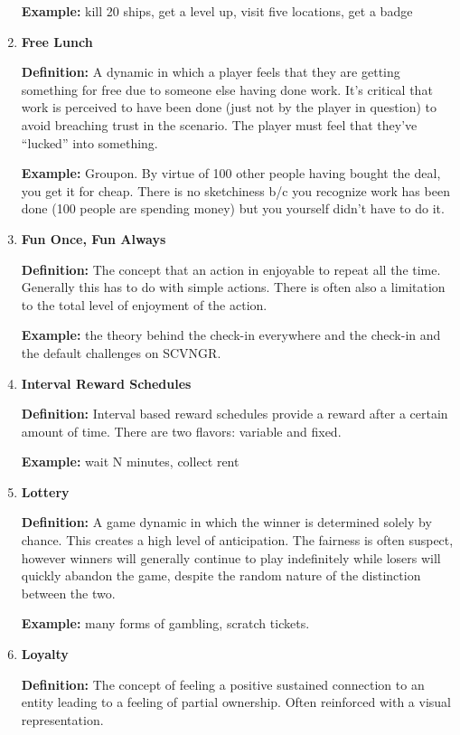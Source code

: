 \begin{enumerate}
\textbf{Example:} kill 20 ships, get a level up, visit five locations, get a badge

\item \textbf{Free Lunch}

\textbf{Definition:} A dynamic in which a player feels that they are getting something for free due to someone else having done work. It’s critical that work is perceived to have been done (just not by the player in question) to avoid breaching trust in the scenario. The player must feel that they’ve ``lucked'' into something.

\textbf{Example:} Groupon. By virtue of 100 other people having bought the deal, you get it for cheap. There is no sketchiness b/c you recognize work has been done (100 people are spending money) but you yourself didn’t have to do it.

\item \textbf{Fun Once, Fun Always}

\textbf{Definition:} The concept that an action in enjoyable to repeat all the time. Generally this has to do with simple actions. There is often also a limitation to the total level of enjoyment of the action.

\textbf{Example:} the theory behind the check-in everywhere and the check-in and the default challenges on SCVNGR.

\item \textbf{Interval Reward Schedules}

\textbf{Definition:} Interval based reward schedules provide a reward after a certain amount of time. There are two flavors: variable and fixed.

\textbf{Example:} wait N minutes, collect rent

\item \textbf{Lottery}

\textbf{Definition:} A game dynamic in which the winner is determined solely by chance. This creates a high level of anticipation. The fairness is often suspect, however winners will generally continue to play indefinitely while losers will quickly abandon the game, despite the random nature of the distinction between the two.

\textbf{Example:} many forms of gambling, scratch tickets.

\item \textbf{Loyalty}

\textbf{Definition:} The concept of feeling a positive sustained connection to an entity leading to a feeling of partial ownership. Often reinforced with a visual representation.


\end{enumerate}
